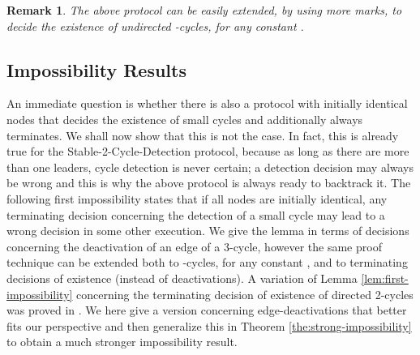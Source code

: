 \documentclass[preprint]{elsarticle}
\newtheorem{remark}{Remark}
\begin{document}
\begin{remark}
The above protocol can be easily extended, by using more marks, to decide the existence of undirected -cycles, for any constant .
\end{remark}

\subsection{Impossibility Results}
\label{subsec:impossibilities}

An immediate question is whether there is also a protocol with initially identical nodes that decides the existence of small cycles and additionally always terminates. We shall now show that this is not the case. In fact, this is already true for the Stable-2-Cycle-Detection protocol, because as long as there are more than one leaders, cycle detection is never certain; a detection decision may always be wrong and this is why the above protocol is always ready to backtrack it. The following first impossibility states that if all nodes are initially identical, any terminating decision concerning the detection of a small cycle may lead to a wrong decision in some other execution. We give the lemma in terms of decisions concerning the deactivation of an edge of a 3-cycle, however the same proof technique can be extended both to -cycles, for any constant , and to terminating decisions of existence (instead of deactivations). A variation of Lemma \ref{lem:first-impossibility} concerning the terminating decision of existence of directed 2-cycles was proved in \cite{CMNS13}. We here give a version concerning edge-deactivations that better fits our perspective and then generalize this in Theorem \ref{the:strong-impossibility} to obtain a much stronger impossibility result.
\end{document}
